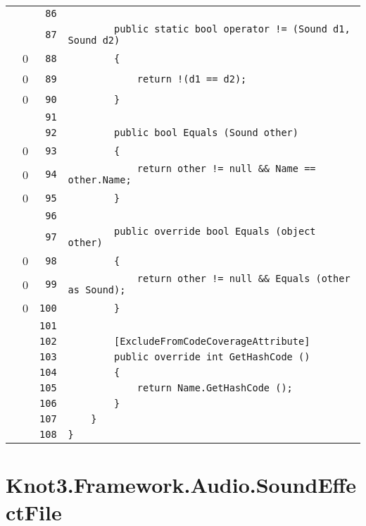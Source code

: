 \documentclass[a4paper,10pt]{article}
\begin{document}
\begin{longtable}[l]{lrrl}
\cellcolor{gray} &  & \verb~86~ & \verb~~\\
\cellcolor{gray} &  & \verb~87~ & \verb~        public static bool operator != (Sound d1, Sound d2)~\\
\cellcolor{red} & 0 & \verb~88~ & \verb~        {~\\
\cellcolor{red} & 0 & \verb~89~ & \verb~            return !(d1 == d2);~\\
\cellcolor{red} & 0 & \verb~90~ & \verb~        }~\\
\cellcolor{gray} &  & \verb~91~ & \verb~~\\
\cellcolor{gray} &  & \verb~92~ & \verb~        public bool Equals (Sound other)~\\
\cellcolor{red} & 0 & \verb~93~ & \verb~        {~\\
\cellcolor{red} & 0 & \verb~94~ & \verb~            return other != null && Name == other.Name;~\\
\cellcolor{red} & 0 & \verb~95~ & \verb~        }~\\
\cellcolor{gray} &  & \verb~96~ & \verb~~\\
\cellcolor{gray} &  & \verb~97~ & \verb~        public override bool Equals (object other)~\\
\cellcolor{red} & 0 & \verb~98~ & \verb~        {~\\
\cellcolor{red} & 0 & \verb~99~ & \verb~            return other != null && Equals (other as Sound);~\\
\cellcolor{red} & 0 & \verb~100~ & \verb~        }~\\
\cellcolor{gray} &  & \verb~101~ & \verb~~\\
\cellcolor{gray} &  & \verb~102~ & \verb~        [ExcludeFromCodeCoverageAttribute]~\\
\cellcolor{gray} &  & \verb~103~ & \verb~        public override int GetHashCode ()~\\
\cellcolor{gray} &  & \verb~104~ & \verb~        {~\\
\cellcolor{gray} &  & \verb~105~ & \verb~            return Name.GetHashCode ();~\\
\cellcolor{gray} &  & \verb~106~ & \verb~        }~\\
\cellcolor{gray} &  & \verb~107~ & \verb~    }~\\
\cellcolor{gray} &  & \verb~108~ & \verb~}~\\
\end{longtable}
\newpage
\section{Knot3.Framework.Audio.SoundEffectFile}
\end{document}
